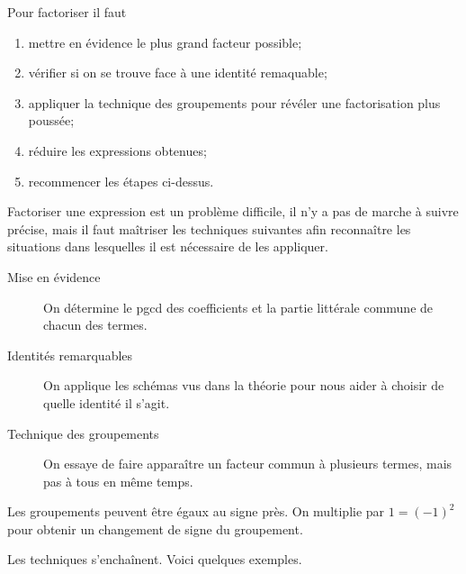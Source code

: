\documentclass[a4paper,12pt]{report}
\begin{document}
 Pour factoriser il faut 
  \begin{enumerate}
	  \item mettre en évidence le plus grand facteur possible;
	  \item vérifier si on se trouve face à une identité remaquable;
	  \item appliquer la technique des groupements pour révéler une factorisation plus poussée;
	\item réduire les expressions obtenues;
	\item recommencer les étapes ci-dessus.
\end{enumerate}
Factoriser une expression est un problème difficile, il n'y a pas de marche à suivre précise, mais il faut maîtriser les techniques suivantes afin reconnaître les situations dans lesquelles il est nécessaire de les appliquer.
\begin{description}
	\item[Mise en évidence] On détermine le pgcd des coefficients et la partie littérale commune de chacun des termes.
\item[Identités remarquables] On applique les schémas vus dans la théorie pour nous aider à choisir de quelle identité il s'agit.
\item[Technique des groupements] On essaye de faire apparaître un facteur commun à plusieurs termes, mais pas à tous en même temps.
\end{description}

\begin{boiteExT}
\vspace{3cm}

\end{boiteExT}
Les groupements peuvent être égaux au signe près. On multiplie par $1=(-1)^2$ pour obtenir un changement de signe du groupement.
\begin{boiteExT}
\vspace{4cm}

\end{boiteExT}
Les techniques s'enchaînent. Voici quelques exemples.

\begin{boiteExT}
	\vspace{4cm}	

\end{boiteExT}

\begin{boiteExT}
	\vspace{6cm}	

\end{boiteExT}
\end{document}
